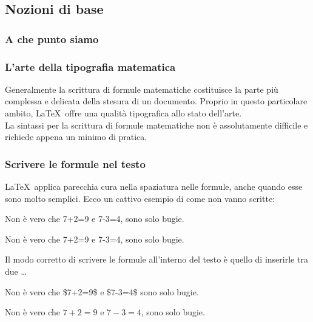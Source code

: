 \documentclass[svgnames,%
	ucs,%
	pdftex]{guitbeamer}
\begin{document}
\subsection{Nozioni di base}
\begin{frame}
  \frametitle{A che punto siamo}
\end{frame}
\begin{frame}
  \frametitle{L'arte della tipografia matematica}
	Generalmente la scrittura di formule matematiche costituisce la parte pi\`u complessa e delicata della stesura di un documento. Proprio in questo particolare ambito, \LaTeX\ offre una qualit\`a tipografica allo stato dell'arte.\\
  \medskip
	La sintassi per la scrittura di formule matematiche non \`e assolutamente difficile e richiede appena un minimo di pratica.
\end{frame}
\begin{frame}
  \frametitle{Scrivere le formule nel testo}
	\LaTeX\ applica parecchia cura nella spaziatura nelle formule, anche quando esse sono molto semplici. Ecco un cattivo esempio di come non vanno scritte:
	\begin{LaTeXcode}
		Non \`e vero che 7+2=9 e 7-3=4, sono solo bugie.
	\end{LaTeXcode}
	\begin{LaTeXoutput}
		Non \`e vero che 7+2=9 e 7-3=4,  sono solo bugie.
	\end{LaTeXoutput}
  \smallskip
	Il modo corretto di scrivere le formule all'interno del testo \`e quello di inserirle tra due \LCmd[]{\textdollar}\dots\LCmd[]{\textdollar}
	\begin{LaTeXcode}
		Non \`e vero che \alert{\$7+2=9\$} e \alert{\$7-3=4\$} sono solo bugie.
	\end{LaTeXcode}
	\begin{LaTeXoutput}
		Non \`e vero che $7+2=9$ e $7-3=4$, sono solo bugie.
	\end{LaTeXoutput}
\end{frame}
\end{document}
